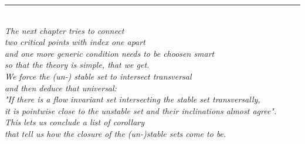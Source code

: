 \begin{minipage}{\textwidth}
\begin{centering}
\rule{0.3\textwidth}{0.4pt} \\
\textit{ The next chapter tries to connect\\
two critical points with index one apart\\
and one more generic condition needs to be choosen smart\\
so that the theory is simple, that we get. \\
We force the (un-) stable set to intersect transversal\\
and then deduce that universal:\\
"If there is a flow invariant set intersecting the stable set transversally,\\
it is pointwise close to the unstable set and their inclinations almost agree".\\
This lets us conclude a list of corollary\\
that tell us how the closure of the (un-)stable sets come to be.\\
~\\}
\end{centering}
\end{minipage}

